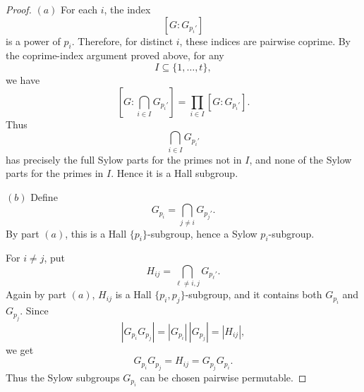 \begin{proof}
\((a)\) For each \(i\), the index
\[
    [G:G_{p_i'}]
\]
is a power of \(p_i\). Therefore, for distinct \(i\), these indices are
pairwise coprime. By the coprime-index argument proved above, for any
\[
    I\subseteq \{1,\ldots,t\},
\]
we have
\[
    \left[G:\bigcap_{i\in I}G_{p_i'}\right]
    =
    \prod_{i\in I}[G:G_{p_i'}].
\]
Thus
\[
    \bigcap_{i\in I}G_{p_i'}
\]
has precisely the full Sylow parts for the primes not in \(I\), and none of the
Sylow parts for the primes in \(I\). Hence it is a Hall subgroup.

\((b)\) Define
\[
    G_{p_i}
    =
    \bigcap_{j\neq i}G_{p_j'}.
\]
By part \((a)\), this is a Hall \(\{p_i\}\)-subgroup, hence a Sylow
\(p_i\)-subgroup.

For \(i\neq j\), put
\[
    H_{ij}
    =
    \bigcap_{\ell\neq i,j}G_{p_\ell'}.
\]
Again by part \((a)\), \(H_{ij}\) is a Hall \(\{p_i,p_j\}\)-subgroup, and it
contains both \(G_{p_i}\) and \(G_{p_j}\). Since
\[
    |G_{p_i}G_{p_j}|=|G_{p_i}|\,|G_{p_j}|=|H_{ij}|,
\]
we get
\[
    G_{p_i}G_{p_j}=H_{ij}=G_{p_j}G_{p_i}.
\]
Thus the Sylow subgroups \(G_{p_i}\) can be chosen pairwise permutable.
\end{proof}
